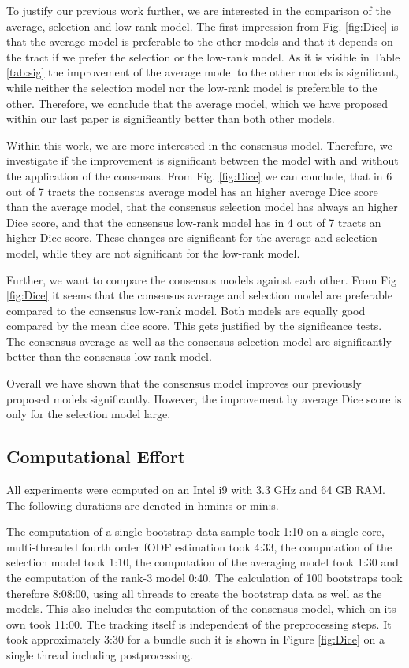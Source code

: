 To justify our previous work further, we are interested in the comparison of the
average, selection and low-rank model. The first impression from Fig.
\ref{fig:Dice} is that the average model is preferable to the other models and
that it depends on the tract if we prefer the selection or the low-rank model.
As it is visible in Table \ref{tab:sig} the improvement of the average model to
the other models is significant, while neither the selection model nor the
low-rank model is preferable to
the other. Therefore, we conclude that the average model, which we have proposed
within our last paper is significantly better than both other models. 

Within this work, we are more interested in the consensus model. Therefore, we
investigate if the improvement is significant between the model with and without
the application of the consensus. From Fig. \ref{fig:Dice} we can conclude, that
in 6 out of 7 tracts the consensus average model has an higher average Dice
score than the average model, that the consensus selection model has always an
higher Dice score, and that the consensus low-rank model has in 4 out of 7
tracts an higher Dice score. These changes are significant for the average and
selection model, while they are not significant for the low-rank model. 

Further, we want to compare the consensus models against each other. From Fig
\ref{fig:Dice} it seems that the consensus average and selection model are
preferable compared to the consensus low-rank model. Both models are equally
good compared by the mean dice score. This gets justified by the significance
tests. The consensus average as well as the consensus selection model are
significantly better than the consensus low-rank model. 

Overall we have shown that the consensus model improves our previously proposed
models significantly. However, the improvement by average Dice score is only for
the selection model large. 
\subsection{Computational Effort}
All experiments were computed on an Intel i9 with 3.3 GHz and 64 GB RAM. The
following durations are denoted in h:min:s or min:s.

The computation of a single bootstrap data sample took 1:10 on a single core,
multi-threaded fourth order fODF estimation took 4:33, the computation of the
selection model took 1:10, the computation of the averaging model took 1:30 and
the computation of the rank-3 model 0:40. The calculation of 100 bootstraps took
therefore 8:08:00, using all threads to create the bootstrap data as well as the
models. This also includes the computation of the consensus model, which on its
own took 11:00. The tracking itself is independent of the preprocessing steps.
It took approximately 3:30 for a bundle such it is shown in Figure
\ref{fig:Dice} on a single thread including postprocessing.  


